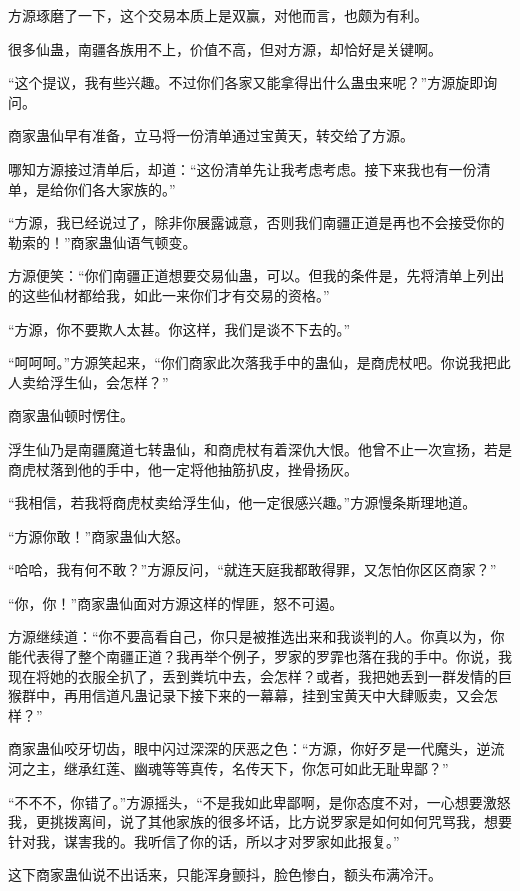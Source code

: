 \begin{this_body}
方源琢磨了一下，这个交易本质上是双赢，对他而言，也颇为有利。

很多仙蛊，南疆各族用不上，价值不高，但对方源，却恰好是关键啊。

“这个提议，我有些兴趣。不过你们各家又能拿得出什么蛊虫来呢？”方源旋即询问。

商家蛊仙早有准备，立马将一份清单通过宝黄天，转交给了方源。

哪知方源接过清单后，却道：“这份清单先让我考虑考虑。接下来我也有一份清单，是给你们各大家族的。”

“方源，我已经说过了，除非你展露诚意，否则我们南疆正道是再也不会接受你的勒索的！”商家蛊仙语气顿变。

方源便笑：“你们南疆正道想要交易仙蛊，可以。但我的条件是，先将清单上列出的这些仙材都给我，如此一来你们才有交易的资格。”

“方源，你不要欺人太甚。你这样，我们是谈不下去的。”

“呵呵呵。”方源笑起来，“你们商家此次落我手中的蛊仙，是商虎杖吧。你说我把此人卖给浮生仙，会怎样？”

商家蛊仙顿时愣住。

浮生仙乃是南疆魔道七转蛊仙，和商虎杖有着深仇大恨。他曾不止一次宣扬，若是商虎杖落到他的手中，他一定将他抽筋扒皮，挫骨扬灰。

“我相信，若我将商虎杖卖给浮生仙，他一定很感兴趣。”方源慢条斯理地道。

“方源你敢！”商家蛊仙大怒。

“哈哈，我有何不敢？”方源反问，“就连天庭我都敢得罪，又怎怕你区区商家？”

“你，你！”商家蛊仙面对方源这样的悍匪，怒不可遏。

方源继续道：“你不要高看自己，你只是被推选出来和我谈判的人。你真以为，你能代表得了整个南疆正道？我再举个例子，罗家的罗霏也落在我的手中。你说，我现在将她的衣服全扒了，丢到粪坑中去，会怎样？或者，我把她丢到一群发情的巨猴群中，再用信道凡蛊记录下接下来的一幕幕，挂到宝黄天中大肆贩卖，又会怎样？”

商家蛊仙咬牙切齿，眼中闪过深深的厌恶之色：“方源，你好歹是一代魔头，逆流河之主，继承红莲、幽魂等等真传，名传天下，你怎可如此无耻卑鄙？”

“不不不，你错了。”方源摇头，“不是我如此卑鄙啊，是你态度不对，一心想要激怒我，更挑拨离间，说了其他家族的很多坏话，比方说罗家是如何如何咒骂我，想要针对我，谋害我的。我听信了你的话，所以才对罗家如此报复。”

这下商家蛊仙说不出话来，只能浑身颤抖，脸色惨白，额头布满冷汗。


\end{this_body}
